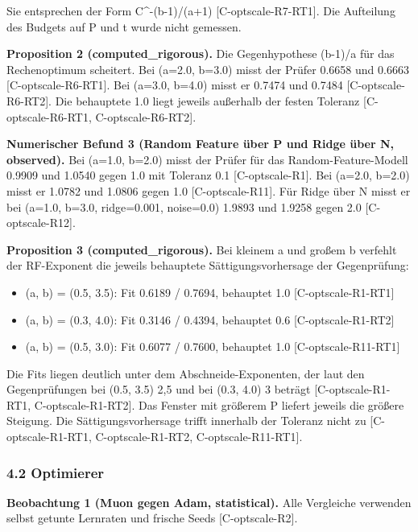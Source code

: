 \documentclass[10pt,twocolumn]{article}
\begin{document}
Sie entsprechen der Form C^-(b-1)/(a+1) {\scriptsize[C-optscale-R7-RT1]}. Die Aufteilung des Budgets auf P und t wurde nicht gemessen.

\textbf{Proposition 2 (computed_rigorous).} Die Gegenhypothese (b-1)/a für das Rechenoptimum scheitert. Bei (a=2.0, b=3.0) misst der Prüfer 0.6658 und 0.6663 {\scriptsize[C-optscale-R6-RT1]}. Bei (a=3.0, b=4.0) misst er 0.7474 und 0.7484 {\scriptsize[C-optscale-R6-RT2]}. Die behauptete 1.0 liegt jeweils außerhalb der festen Toleranz {\scriptsize[C-optscale-R6-RT1, C-optscale-R6-RT2]}.

\textbf{Numerischer Befund 3 (Random Feature über P und Ridge über N, observed).} Bei (a=1.0, b=2.0) misst der Prüfer für das Random-Feature-Modell 0.9909 und 1.0540 gegen 1.0 mit Toleranz 0.1 {\scriptsize[C-optscale-R1]}. Bei (a=2.0, b=2.0) misst er 1.0782 und 1.0806 gegen 1.0 {\scriptsize[C-optscale-R11]}. Für Ridge über N misst er bei (a=1.0, b=3.0, ridge=0.001, noise=0.0) 1.9893 und 1.9258 gegen 2.0 {\scriptsize[C-optscale-R12]}.

\textbf{Proposition 3 (computed_rigorous).} Bei kleinem a und großem b verfehlt der RF-Exponent die jeweils behauptete Sättigungsvorhersage der Gegenprüfung:

\begin{itemize}
\item (a, b) = (0.5, 3.5): Fit 0.6189 / 0.7694, behauptet 1.0 {\scriptsize[C-optscale-R1-RT1]}
\item (a, b) = (0.3, 4.0): Fit 0.3146 / 0.4394, behauptet 0.6 {\scriptsize[C-optscale-R1-RT2]}
\item (a, b) = (0.5, 3.0): Fit 0.6077 / 0.7600, behauptet 1.0 {\scriptsize[C-optscale-R11-RT1]}
\end{itemize}

Die Fits liegen deutlich unter dem Abschneide-Exponenten, der laut den Gegenprüfungen bei (0.5, 3.5) 2,5 und bei (0.3, 4.0) 3 beträgt {\scriptsize[C-optscale-R1-RT1, C-optscale-R1-RT2]}. Das Fenster mit größerem P liefert jeweils die größere Steigung. Die Sättigungsvorhersage trifft innerhalb der Toleranz nicht zu {\scriptsize[C-optscale-R1-RT1, C-optscale-R1-RT2, C-optscale-R11-RT1]}.

\subsubsection*{4.2 Optimierer}

\textbf{Beobachtung 1 (Muon gegen Adam, statistical).} Alle Vergleiche verwenden selbst getunte Lernraten und frische Seeds {\scriptsize[C-optscale-R2]}.
\end{document}
